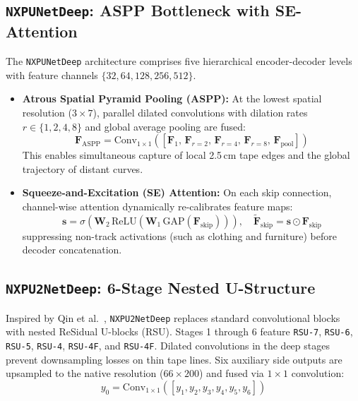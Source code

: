 \documentclass[10pt,journal,compsoc]{IEEEtran}
\begin{document}
\subsection{\texttt{NXPUNetDeep}: ASPP Bottleneck with SE-Attention}
The \texttt{NXPUNetDeep} architecture comprises five hierarchical encoder-decoder levels with feature channels $\{32, 64, 128, 256, 512\}$.
\begin{itemize}
    \item \textbf{Atrous Spatial Pyramid Pooling (ASPP):} At the lowest spatial resolution ($3 \times 7$), parallel dilated convolutions with dilation rates $r \in \{1, 2, 4, 8\}$ and global average pooling are fused:
    \begin{equation}
    \mathbf{F}_{\text{ASPP}} = \text{Conv}_{1 \times 1}\left(\left[\mathbf{F}_1, \, \mathbf{F}_{r=2}, \, \mathbf{F}_{r=4}, \, \mathbf{F}_{r=8}, \, \mathbf{F}_{\text{pool}}\right]\right)
    \end{equation}
    This enables simultaneous capture of local 2.5\,cm tape edges and the global trajectory of distant curves.
    \item \textbf{Squeeze-and-Excitation (SE) Attention:} On each skip connection, channel-wise attention dynamically re-calibrates feature maps:
    \begin{equation}
    \mathbf{s} = \sigma\left(\mathbf{W}_2 \, \text{ReLU}\left(\mathbf{W}_1 \, \text{GAP}(\mathbf{F}_{\text{skip}})\right)\right), \quad \widetilde{\mathbf{F}}_{\text{skip}} = \mathbf{s} \odot \mathbf{F}_{\text{skip}}
    \end{equation}
    suppressing non-track activations (such as clothing and furniture) before decoder concatenation.
\end{itemize}

\subsection{\texttt{NXPU2NetDeep}: 6-Stage Nested U-Structure}
Inspired by Qin et al.~\cite{qin2020u2}, \texttt{NXPU2NetDeep} replaces standard convolutional blocks with nested ReSidual U-blocks (RSU). Stages 1 through 6 feature \texttt{RSU-7}, \texttt{RSU-6}, \texttt{RSU-5}, \texttt{RSU-4}, \texttt{RSU-4F}, and \texttt{RSU-4F}. Dilated convolutions in the deep stages prevent downsampling losses on thin tape lines. Six auxiliary side outputs are upsampled to the native resolution ($66 \times 200$) and fused via $1 \times 1$ convolution:
\begin{equation}
y_0 = \text{Conv}_{1 \times 1}\left(\left[y_1, y_2, y_3, y_4, y_5, y_6\right]\right)
\end{equation}
\end{document}
